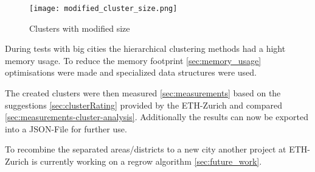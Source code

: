 \begin{figure}[ht]
    \centering
    \begin{mdframed}[style=mdthight, userdefinedwidth=0.4\linewidth, align=center]
        \texttt{[image: modified\_cluster\_size.png]}
    \end{mdframed}
    \caption{Clusters with modified size}
    \label{fig:cluster_with_mod_sizes}
\end{figure}

During tests with big cities the hierarchical clustering methods had a hight memory usage. To reduce the memory footprint \ref{sec:memory_usage} optimisations were made and specialized data structures were used.

The created clusters were then measured \ref{sec:measurements} based on the suggestions \ref{sec:clusterRating} provided by the ETH-Zurich and compared \ref{sec:measurements-cluster-analysis}. Additionally the results can now be exported into a JSON-File for further use.

To recombine the separated areas/districts to a new city another project at ETH-Zurich is currently working on a regrow algorithm \ref{sec:future_work}. 